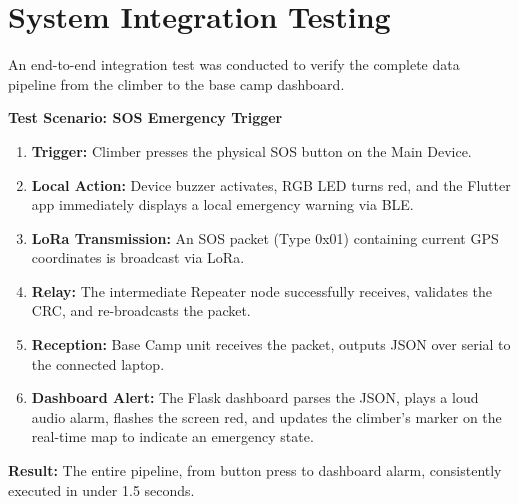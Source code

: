 \section{System Integration Testing}
\label{sec:integration_testing}

An end-to-end integration test was conducted to verify the complete data pipeline from the climber to the base camp dashboard.

\textbf{Test Scenario: SOS Emergency Trigger}
\begin{enumerate}
    \item \textbf{Trigger:} Climber presses the physical SOS button on the Main Device.
    \item \textbf{Local Action:} Device buzzer activates, RGB LED turns red, and the Flutter app immediately displays a local emergency warning via BLE.
    \item \textbf{LoRa Transmission:} An SOS packet (Type 0x01) containing current GPS coordinates is broadcast via LoRa.
    \item \textbf{Relay:} The intermediate Repeater node successfully receives, validates the CRC, and re-broadcasts the packet.
    \item \textbf{Reception:} Base Camp unit receives the packet, outputs JSON over serial to the connected laptop.
    \item \textbf{Dashboard Alert:} The Flask dashboard parses the JSON, plays a loud audio alarm, flashes the screen red, and updates the climber's marker on the real-time map to indicate an emergency state.
\end{enumerate}

\textbf{Result:} The entire pipeline, from button press to dashboard alarm, consistently executed in under 1.5 seconds.
